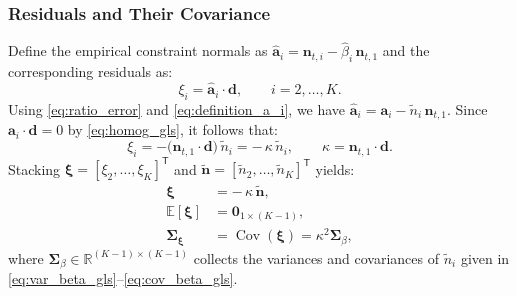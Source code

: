 \documentclass[journal]{IEEEtran}
\begin{document}
\subsubsection{Residuals and Their Covariance}
Define the empirical constraint normals as
\(\hat{\mathbf a}_i = \mathbf n_{t,i} - \hat\beta_i\,\mathbf n_{t,1}\)
and the corresponding residuals as:
\begin{equation}
\xi_i = \hat{\mathbf a}_i\cdot\mathbf d,\qquad i=2,\ldots,K.
\label{eq:residual_def}
\end{equation}
Using \eqref{eq:ratio_error} and \eqref{eq:definition_a_i}, we have
\(
\hat{\mathbf a}_i=\mathbf a_i-\tilde n_i\,\mathbf n_{t,1}
\).
Since \(\mathbf a_i\cdot\mathbf d=0\) by \eqref{eq:homog_gls}, it follows that:
\begin{equation}
\xi_i
= -\bigl(\mathbf n_{t,1}\!\cdot\!\mathbf d\bigr)\,\tilde n_i
= -\,\kappa\,\tilde n_i,
\qquad
\kappa = \mathbf n_{t,1}\!\cdot\!\mathbf d.
\label{eq:residual_scalar}
\end{equation}
Stacking \(\boldsymbol{\xi}=[\xi_2,\ldots,\xi_K]^{\mathsf T}\) and
\(\tilde{\boldsymbol n}=[\tilde n_2,\ldots,\tilde n_K]^{\mathsf T}\) yields:
\begin{equation}
\begin{aligned}
\boldsymbol{\xi} &= -\,\kappa\,\tilde{\boldsymbol n}, \\
\mathbb E[\boldsymbol{\xi}] &= \mathbf{0}_{1\times (K-1)}, \\
\mathbf \Sigma_{\boldsymbol{\xi}} &= \operatorname{Cov}(\boldsymbol{\xi})
= \kappa^{2}\mathbf\Sigma_{\beta},
\end{aligned}
\label{eq:residual_cov}
\end{equation}
where \(\mathbf\Sigma_{\beta}\in\mathbb R^{(K-1)\times(K-1)}\) collects the variances and covariances of \(\tilde n_i\) given in \eqref{eq:var_beta_gls}–\eqref{eq:cov_beta_gls}. 
\end{document}
